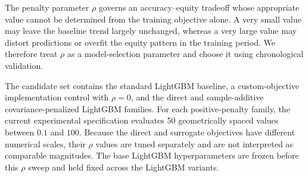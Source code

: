 \documentclass[10pt]{article}
\theoremstyle{definition}
\newcommand{\1}{\mathbf{1}}
\newcommand{\argmaxop}{\operatorname*{arg\,max}}
\begin{document}
{{The penalty parameter $\rho$ governs an accuracy--equity tradeoff whose appropriate value cannot be determined from the training objective alone. A very small value may leave the baseline trend largely unchanged, whereas a very large value may distort predictions or overfit the equity pattern in the training period. We therefore treat $\rho$ as a model-selection parameter and choose it using chronological validation.

\textcolor{impGreen}{The candidate set contains the standard LightGBM baseline, a custom-objective implementation control with $\rho=0$, and the direct and sample-additive covariance-penalized LightGBM families. For each positive-penalty family, the current experimental specification evaluates 50 geometrically spaced values between $0.1$ and $100$. Because the direct and surrogate objectives have different numerical scales, their $\rho$ values are tuned separately and are not interpreted as comparable magnitudes. The base LightGBM hyperparameters are frozen before this $\rho$ sweep and held fixed across the LightGBM variants.}



}}
\end{document}
